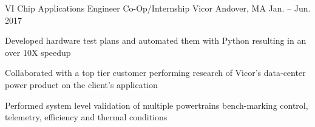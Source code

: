 \begin{cventries}
  	\cventry
	{VI Chip Applications Engineer Co-Op/Internship} %
    {Vicor} %
    {Andover, MA} %
    {Jan. – Jun. 2017} %
    {
    \begin{cvitems} %
    	\item{Developed hardware test plans and automated them with Python resulting in an over 10X speedup}
        \item {Collaborated with a top tier customer performing research of Vicor’s data-center power product on the client's application}
        \item{Performed system level validation of multiple powertrains bench-marking control, telemetry, efficiency and thermal conditions}
      \end{cvitems}
    }


\end{cventries}
